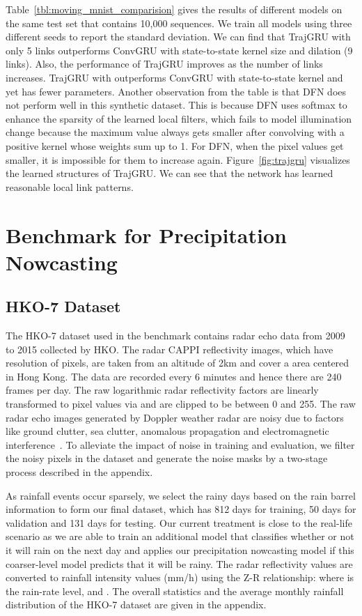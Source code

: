 \documentclass{article}
\begin{document}
Table~\ref{tbl:moving_mnist_comparision} gives the results of different models
on the same test set that contains 10,000 sequences. We train all models using three different seeds to report the standard deviation. We can find that TrajGRU
with only 5 links outperforms ConvGRU with state-to-state kernel size 
and dilation  (9 links). Also, the performance of TrajGRU improves
as the number of links increases. TrajGRU with  outperforms ConvGRU with
 state-to-state kernel and yet has fewer parameters. Another
observation from the table is that DFN does not perform well in this synthetic
dataset. This is because DFN uses softmax to enhance the sparsity of the learned
local filters, which fails to model illumination change because the maximum value
always gets smaller after convolving with a positive kernel whose weights sum up to
1. For DFN, when the pixel values get smaller, it is impossible for them to
increase again. Figure~\ref{fig:trajgru} visualizes the learned structures of TrajGRU. We can see that the network has learned reasonable local link patterns.

\section{Benchmark for Precipitation Nowcasting}
\subsection{HKO-7 Dataset}
The HKO-7 dataset used in the benchmark contains radar echo data from 2009 to 2015 collected by HKO. The radar CAPPI reflectivity images, which have resolution of  pixels, are taken from an altitude of 2km and cover a  area centered in Hong Kong. The data are recorded every 6 minutes and hence there are 240 frames per day. The raw logarithmic radar reflectivity factors are linearly transformed to pixel values via  and are clipped to be between 0 and 255. The raw radar echo images generated by Doppler weather radar are noisy due to factors like ground clutter, sea clutter, anomalous propagation and electromagnetic interference~\cite{lee2017ensemble}. To alleviate the impact of noise in training and evaluation, we filter the noisy pixels in the dataset and generate the noise masks by a two-stage process described in the appendix.

As rainfall events occur sparsely, we select the rainy days based on the rain barrel information to form our final dataset, which has 812 days for training, 50 days for validation and 131 days for testing. Our current treatment is close to the real-life scenario as we are able to train an additional model that classifies whether or not it will rain on the next day and applies our precipitation nowcasting model if this coarser-level model predicts that it will be rainy. The radar reflectivity values are converted to rainfall intensity values (mm/h) using the Z-R relationship:  where  is the rain-rate level,  and . The overall statistics and the average monthly rainfall distribution of the HKO-7 dataset are given in the appendix.
\end{document}
